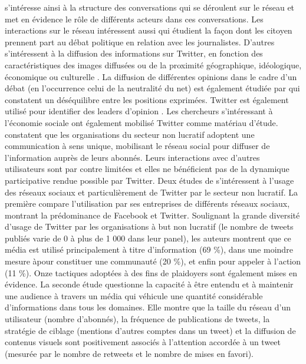         \textcite{bruns2012how} s’intéresse ainsi à la structure des conversations qui se déroulent sur le réseau et met en évidence le rôle de différents acteurs dans ces conversations. Les interactions sur le réseau intéressent aussi \textcite{xu2014talking} qui étudient la façon dont les citoyen prennent part au débat politique en relation avec les journalistes. D’autres s’intéressent à la diffusion des informations sur Twitter, en fonction des caractéristiques des images diffusées \parencite{stefanone2015image} ou de la proximité géographique, idéologique, économique ou culturelle \parencite{kwon2015spatiotemporal}. La diffusion de différentes opinions dans le cadre d’un débat (en l’occurrence celui de la neutralité du net) est également étudiée par \textcite{lee2015shaping} qui constatent un déséquilibre entre les positions exprimées. Twitter est également utilisé pour identifier des leaders d’opinion \parencite{xu2014twitter}. Les chercheurs s’intéressant à l’économie sociale ont également mobilisé Twitter comme matériau d’étude. \textcite{waters2011tweet} constatent que les organisations du secteur non lucratif adoptent une communication à sens unique, mobilisant le réseau social pour diffuser de l’information auprès de leurs abonnés. Leurs interactions avec d’autres utilisateurs sont par contre limitées et elles ne bénéficient pas de la dynamique participative rendue possible par Twitter. Deux études de \textcite{guo2014tweeting,guo2017speaking} s’intéressent à l’usage des réseaux sociaux et particulièrement de Twitter par le secteur non lucratif.  La première compare l’utilisation par ses entreprises de différents réseaux sociaux, montrant la prédominance de Facebook et Twitter. Soulignant la grande diversité d’usage de Twitter par les organisations à but non lucratif (le nombre de tweets publiés varie de 0 à plus de 1 000 dans leur panel), les auteurs montrent que ce média est utilisé principalement à titre d’information (69 \%), dans une moindre mesure àpour constituer une communauté (20 \%), et enfin pour appeler à l’action (11 \%). Onze tactiques adoptées à des fins de plaidoyers sont également mises en évidence. La seconde étude questionne la capacité à être entendu et à maintenir une audience à travers un média qui véhicule une quantité considérable d’informations dans tous les domaines. Elle montre que la taille du réseau d’un utilisateur (nombre d’abonnés), la fréquence de publications de tweets, la stratégie de ciblage (mentions d’autres comptes dans un tweet) et la diffusion de contenus visuels sont positivement associés à l’attention accordée à un tweet (mesurée par le nombre de retweets et le nombre de mises en favori). \\

